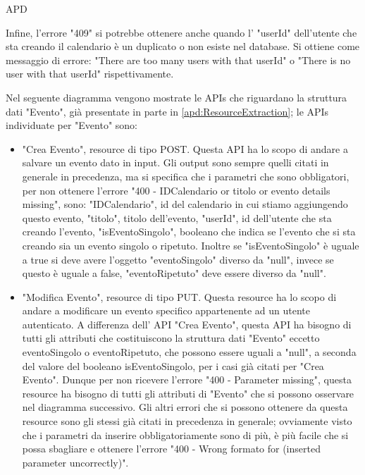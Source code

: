 \begin{listaPersonale} {APD}
\begin{listaPersonale2}[APD]{}
\begin{listaPersonale3}[APD]{}
\begin{itemize}
                      Infine, l'errore "409" si potrebbe ottenere anche quando l' "userId" dell'utente che sta creando il calendario è un duplicato o non esiste nel database. Si ottiene come messaggio di errore: "There are too many users with that userId" o "There is no user with that userId" rispettivamente.
            \end{itemize}
            \begin{center}
                
            \end{center}
            Nel seguente diagramma vengono mostrate le APIs che riguardano la struttura dati "Evento", già presentate in parte in \ref{apd:ResourceExtraction}; le APIs individuate per "Evento" sono:
            \begin{itemize}
                \item "Crea Evento", resource di tipo POST. Questa API ha lo scopo di andare a salvare un evento dato in input. Gli output sono sempre quelli citati in generale in precedenza, ma si specifica che i parametri che sono obbligatori, per non ottenere l'errore "400 - IDCalendario or titolo or evento details missing", sono: "IDCalendario", id del calendario in cui stiamo aggiungendo questo evento, "titolo", titolo dell'evento, "userId", id dell'utente che sta creando l'evento, "isEventoSingolo", booleano che indica se l'evento che si sta creando sia un evento singolo o ripetuto. Inoltre se "isEventoSingolo" è uguale a true si deve avere l'oggetto "eventoSingolo" diverso da "null", invece se questo è uguale a false, "eventoRipetuto" deve essere diverso da "null".
                \item "Modifica Evento", resource di tipo PUT. Questa resource ha lo scopo di andare a modificare un evento specifico appartenente ad un utente autenticato. A differenza dell' API "Crea Evento", questa API ha bisogno di tutti gli attributi che costituiscono la struttura dati "Evento" eccetto eventoSingolo o eventoRipetuto, che possono essere uguali a "null", a seconda del valore del booleano isEventoSingolo, per i casi già citati per "Crea Evento". Dunque per non ricevere l'errore "400 - Parameter missing", questa resource ha bisogno di tutti gli attributi di "Evento" che si possono osservare nel diagramma successivo. Gli altri errori che si possono ottenere da questa resource sono gli stessi già citati in precedenza in generale; ovviamente visto che i parametri da inserire obbligatoriamente sono di più, è più facile che si possa sbagliare e ottenere l'errore "400 - Wrong formato for (inserted parameter uncorrectly)".

\end{itemize}
\end{listaPersonale3}
\end{listaPersonale2}
\end{listaPersonale}
